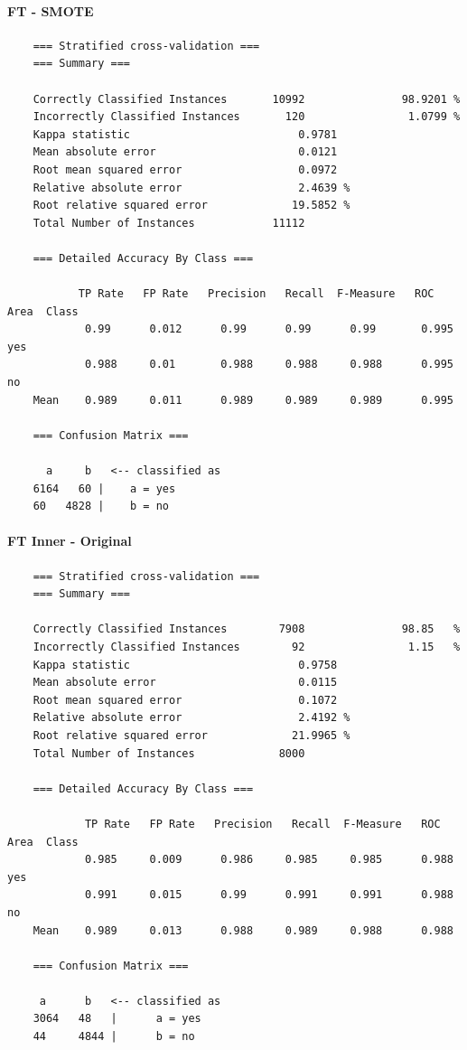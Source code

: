 \pagebreak
\paragraph{FT - SMOTE}
{\scriptsize
	\begin{verbatim}
	=== Stratified cross-validation ===
	=== Summary ===
	
	Correctly Classified Instances       10992               98.9201 %
	Incorrectly Classified Instances       120                1.0799 %
	Kappa statistic                          0.9781
	Mean absolute error                      0.0121
	Root mean squared error                  0.0972
	Relative absolute error                  2.4639 %
	Root relative squared error             19.5852 %
	Total Number of Instances            11112     
	
	=== Detailed Accuracy By Class ===
	
	       TP Rate   FP Rate   Precision   Recall  F-Measure   ROC Area  Class
	        0.99      0.012      0.99      0.99      0.99       0.995    yes
	        0.988     0.01       0.988     0.988     0.988      0.995    no
	Mean    0.989     0.011      0.989     0.989     0.989      0.995
	
	=== Confusion Matrix ===
	
	  a     b   <-- classified as
	6164   60 |    a = yes
	60   4828 |    b = no
	\end{verbatim}
}

\paragraph{FT Inner - Original}
{\scriptsize
	\begin{verbatim}
	=== Stratified cross-validation ===
	=== Summary ===
	
	Correctly Classified Instances        7908               98.85   %
	Incorrectly Classified Instances        92                1.15   %
	Kappa statistic                          0.9758
	Mean absolute error                      0.0115
	Root mean squared error                  0.1072
	Relative absolute error                  2.4192 %
	Root relative squared error             21.9965 %
	Total Number of Instances             8000     
	
	=== Detailed Accuracy By Class ===
	
	        TP Rate   FP Rate   Precision   Recall  F-Measure   ROC Area  Class
	        0.985     0.009      0.986     0.985     0.985      0.988    yes
	        0.991     0.015      0.99      0.991     0.991      0.988    no
	Mean    0.989     0.013      0.988     0.989     0.988      0.988
	
	=== Confusion Matrix ===
	
	 a      b   <-- classified as
	3064   48   |      a = yes
	44     4844 |      b = no
	\end{verbatim}
}

